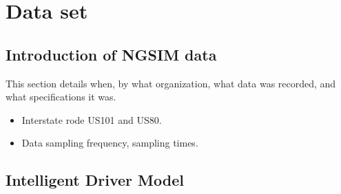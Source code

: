 \chapter{Data set}
\label{chapter:dataset}

\section{Introduction of NGSIM data}

This section details when, by what organization, what data was recorded, and what specifications it was.


\begin{itemize}
\item Interstate rode US101 and US80.
\item Data sampling frequency, sampling times.
\end{itemize}

\section{Intelligent Driver Model}

